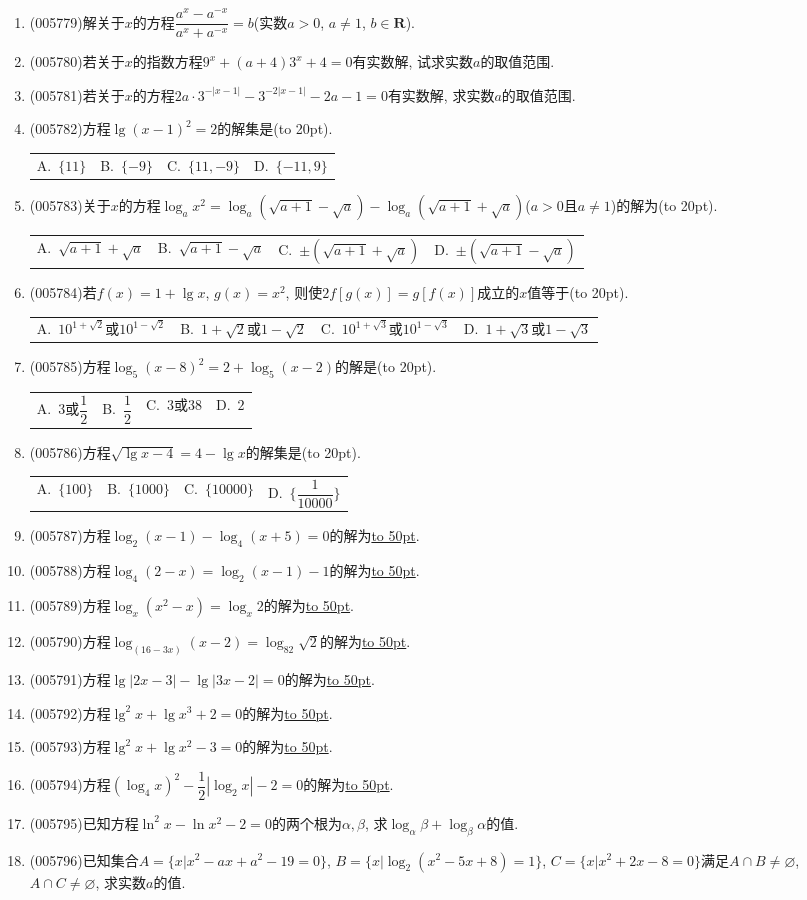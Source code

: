\documentclass[10pt,a4paper]{article}
\newcommand{\blank}[1]{\underline{\hbox to #1pt{}}}
\newcommand{\bracket}[1]{(\hbox to #1pt{})}
\newcommand{\fourch}[4]{\par\begin{tabular}{p{.23\textwidth}p{.23\textwidth}p{.23\textwidth}p{.23\textwidth}}
A.~#1 &B.~#2& C.~#3& D.~#4
\end{tabular}}
\begin{document}
\begin{enumerate}[1.]
\item {\tiny (005779)}解关于$x$的方程$\dfrac{a^x-a^{-x}}{a^x+a^{-x}}=b$(实数$a>0$, $a\ne 1$, $b\in \mathbf{R}$).
\item {\tiny (005780)}若关于$x$的指数方程$9^x+(a+4)3^x+4=0$有实数解, 试求实数$a$的取值范围.
\item {\tiny (005781)}若关于$x$的方程$2a\cdot 3^{-|x-1|}-3^{-2|x-1|}-2a-1=0$有实数解, 求实数$a$的取值范围.
\item {\tiny (005782)}方程$\lg (x-1)^2=2$的解集是\bracket{20}.
\fourch{$\{11\}$}{$\{-9\}$}{$\{11,-9\}$}{$\{-11,9\}$}
\item {\tiny (005783)}关于$x$的方程$\log_ax^2=\log_a(\sqrt {a+1}-\sqrt a)-\log_a(\sqrt {a+1}+\sqrt a)$($a>0$且$a\ne 1$)的解为\bracket{20}.
\fourch{$\sqrt {a+1}+\sqrt a$}{$\sqrt {a+1}-\sqrt a$}{$\pm (\sqrt {a+1}+\sqrt a)$}{$\pm (\sqrt {a+1}-\sqrt a)$}
\item {\tiny (005784)}若$f(x)=1+\lg x$, $g(x)=x^2$, 则使$2f[g(x)]=g[f(x)]$成立的$x$值等于\bracket{20}.
\fourch{$10^{1+\sqrt 2}$或$10^{1-\sqrt 2}$}{$1+\sqrt 2$或$1-\sqrt 2$}{$10^{1+\sqrt 3}$或$10^{1-\sqrt 3}$}{$1+\sqrt 3$或$1-\sqrt 3$}
\item {\tiny (005785)}方程$\log_5(x-8)^2=2+\log_5(x-2)$的解是\bracket{20}.
\fourch{3或$\dfrac 12$}{$\dfrac 12$}{$3$或$38$}{$2$}
\item {\tiny (005786)}方程$\sqrt {\lg x-4}=4-\lg x$的解集是\bracket{20}.
\fourch{$\{100\}$}{$\{1000\}$}{$\{10000\}$}{$\{\dfrac 1{10000}\}$}
\item {\tiny (005787)}方程$\log_2(x-1)-\log_4(x+5)=0$的解为\blank{50}.
\item {\tiny (005788)}方程$\log_4(2-x)=\log_2(x-1)-1$的解为\blank{50}.
\item {\tiny (005789)}方程$\log_x(x^2-x)=\log_x2$的解为\blank{50}.
\item {\tiny (005790)}方程$\log_{(16-3x)}(x-2)=\log_82\sqrt 2$的解为\blank{50}.
\item {\tiny (005791)}方程$\lg|2x-3|-\lg|3x-2|=0$的解为\blank{50}.
\item {\tiny (005792)}方程$\lg ^2x+\lg x^3+2=0$的解为\blank{50}.
\item {\tiny (005793)}方程$\lg ^2x+\lg x^2-3=0$的解为\blank{50}.
\item {\tiny (005794)}方程$(\log_4x)^2-\dfrac 12|\log_2x|-2=0$的解为\blank{50}.
\item {\tiny (005795)}已知方程$\ln ^2x-\ln x^2-2=0$的两个根为$\alpha ,\beta$, 求$\log_{\alpha }\beta +\log_{\beta }\alpha$的值.
\item {\tiny (005796)}已知集合$A=\{x|x^2-ax+a^2-19=0\}$, $B=\{x|\log_2(x^2-5x+8)=1\}$, $C=\{x|x^2+2x-8=0\}$满足$A\cap B\ne \varnothing$, $A\cap C\ne \varnothing$, 求实数$a$的值.

\end{enumerate}
\end{document}
